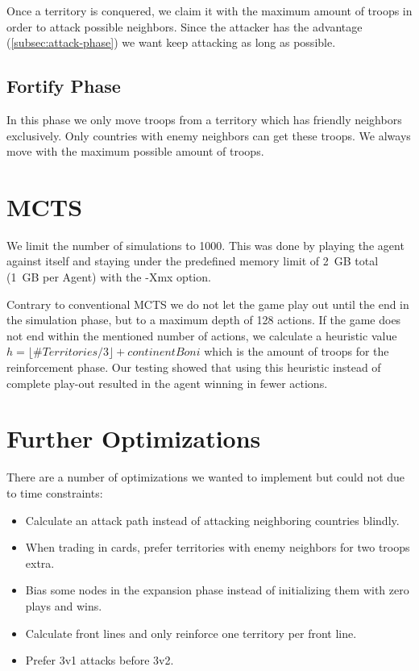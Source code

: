 \documentclass[conference]{IEEEtran}
\begin{document}
Once a territory is conquered, we claim it with the maximum amount of troops in order to attack possible neighbors.
Since the attacker has the advantage (\ref{subsec:attack-phase}) we want keep attacking as long as possible.

\subsection{Fortify Phase}
\label{subsec:foritfy-phase}

In this phase we only move troops from a territory which has friendly neighbors exclusively.
Only countries with enemy neighbors can get these troops.
We always move with the maximum possible amount of troops.

\section{MCTS}
\label{sec:mcts}

We limit the number of simulations to 1000.
This was done by playing the agent against itself and staying under the predefined memory limit of 2~GB total
(1~GB per Agent) with the -Xmx option.

Contrary to conventional MCTS we do not let the game play out until the end in the simulation phase,
but to a maximum depth of 128 actions.
If the game does not end within the mentioned number of actions, we calculate a heuristic value
$h = \lfloor\# Territories/3\rfloor + continentBoni$
which is the amount of troops for the reinforcement phase.
Our testing showed that using this heuristic instead of complete play-out resulted in the agent winning in fewer actions.

\section{Further Optimizations}

There are a number of optimizations we wanted to implement but could not due to time constraints:
\begin{itemize}
    \item Calculate an attack path instead of attacking neighboring countries blindly.
    \item When trading in cards, prefer territories with enemy neighbors for two troops extra.
    \item Bias some nodes in the expansion phase instead of initializing them with zero plays and wins.
    \item Calculate front lines and only reinforce one territory per front line.
    \item Prefer 3v1 attacks before 3v2.
\end{itemize}



\end{document}
